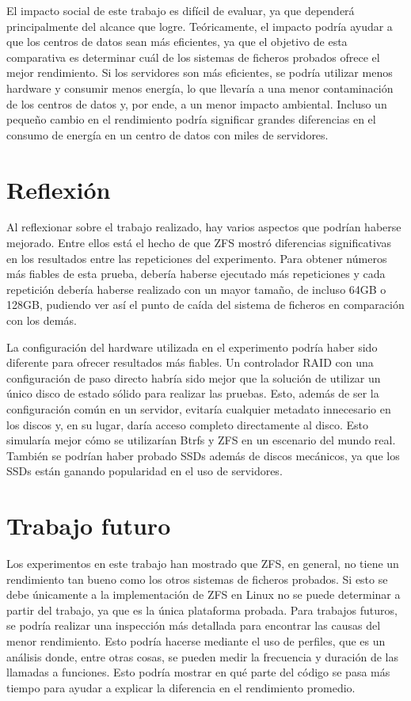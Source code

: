 El impacto social de este trabajo es difícil de evaluar, ya que dependerá principalmente del alcance que logre. Teóricamente, el impacto podría ayudar a que los centros de datos sean más eficientes, ya que el objetivo de esta comparativa es determinar cuál de los sistemas de ficheros probados ofrece el mejor rendimiento. Si los servidores son más eficientes, se podría utilizar menos hardware y consumir menos energía, lo que llevaría a una menor contaminación de los centros de datos y, por ende, a un menor impacto ambiental. Incluso un pequeño cambio en el rendimiento podría significar grandes diferencias en el consumo de energía en un centro de datos con miles de servidores.

\section{Reflexión}

Al reflexionar sobre el trabajo realizado, hay varios aspectos que podrían haberse mejorado. Entre ellos está el hecho de que ZFS mostró diferencias significativas en los resultados entre las repeticiones del experimento. Para obtener números más fiables de esta prueba, debería haberse ejecutado más repeticiones y cada repetición debería haberse realizado con un mayor tamaño, de incluso 64GB o 128GB, pudiendo ver así el punto de caída del sistema de ficheros en comparación con los demás.

La configuración del hardware utilizada en el experimento podría haber sido diferente para ofrecer resultados más fiables. Un controlador RAID con una configuración de paso directo habría sido mejor que la solución de utilizar un único disco de estado sólido para realizar las pruebas. Esto, además de ser la configuración común en un servidor, evitaría cualquier metadato innecesario en los discos y, en su lugar, daría acceso completo directamente al disco. Esto simularía mejor cómo se utilizarían Btrfs y ZFS en un escenario del mundo real. También se podrían haber probado SSDs además de discos mecánicos, ya que los SSDs están ganando popularidad en el uso de servidores.

\section{Trabajo futuro}

Los experimentos en este trabajo han mostrado que ZFS, en general, no tiene un rendimiento tan bueno como los otros sistemas de ficheros probados. Si esto se debe únicamente a la implementación de ZFS en Linux no se puede determinar a partir del trabajo, ya que es la única plataforma probada. Para trabajos futuros, se podría realizar una inspección más detallada para encontrar las causas del menor rendimiento. Esto podría hacerse mediante el uso de perfiles, que es un análisis donde, entre otras cosas, se pueden medir la frecuencia y duración de las llamadas a funciones. Esto podría mostrar en qué parte del código se pasa más tiempo para ayudar a explicar la diferencia en el rendimiento promedio.

